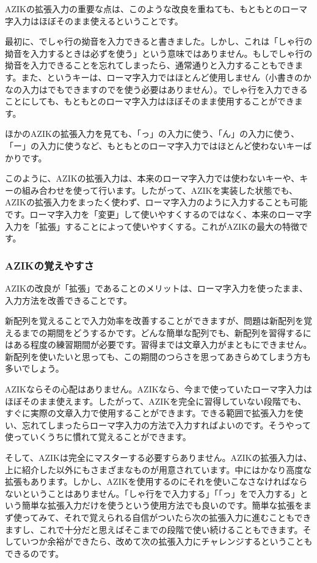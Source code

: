 AZIKの拡張入力の重要な点は、このような改良を重ねても、もともとのローマ字入力はほぼそのまま使えるということです。

最初に、でしゃ行の拗音を入力できると書きました。しかし、これは「しゃ行の拗音を入力するときは必ずを使う」という意味ではありません。もしでしゃ行の拗音を入力できることを忘れてしまったら、通常通りと入力することもできます。また、というキーは、ローマ字入力ではほとんど使用しません（小書きのかなの入力はでもできますのでを使う必要はありません）。でしゃ行を入力できることにしても、もともとのローマ字入力はほぼそのまま使用することができます。

ほかのAZIKの拡張入力を見ても、「っ」の入力に使う\key{;}、「ん」の入力に使う、「ー」の入力に使う\key{:}など、もともとのローマ字入力ではほとんど使わないキーばかりです。

このように、AZIKの拡張入力は、本来のローマ字入力では使わないキーや、キーの組み合わせを使って行います。したがって、AZIKを実装した状態でも、AZIKの拡張入力をまったく使わず、ローマ字入力のように入力することも可能です。ローマ字入力を「変更」して使いやすくするのではなく、本来のローマ字入力を「拡張」することによって使いやすくする。これがAZIKの最大の特徴です。

\subsubsection*{AZIKの覚えやすさ}

AZIKの改良が「拡張」であることのメリットは、ローマ字入力を使ったまま、入力方法を改善できることです。

新配列を覚えることで入力効率を改善することができますが、問題は新配列を覚えるまでの期間をどうするかです。どんな簡単な配列でも、新配列を習得するにはある程度の練習期間が必要です。習得までは文章入力がまともにできません。新配列を使いたいと思っても、この期間のつらさを思ってあきらめてしまう方も多いでしょう。

AZIKならその心配はありません。AZIKなら、今まで使っていたローマ字入力はほぼそのまま使えます。したがって、AZIKを完全に習得していない段階でも、すぐに実際の文章入力で使用することができます。できる範囲で拡張入力を使い、忘れてしまったらローマ字入力の方法で入力すればよいのです。そうやって使っていくうちに慣れて覚えることができます。

そして、AZIKは完全にマスターする必要すらありません。AZIKの拡張入力は、上に紹介した以外にもさまざまなものが用意されています。中にはかなり高度な拡張もあります。しかし、AZIKを使用するのにそれを使いこなさなければならないということはありません。「しゃ行をで入力する」「「っ」を\key{;}で入力する」という簡単な拡張入力だけを使うという使用方法でも良いのです。簡単な拡張をまず使ってみて、それで覚えられる自信がついたら次の拡張入力に進むこともできますし、これで十分だと思えばそこまでの段階で使い続けることもできます。そしていつか余裕ができたら、改めて次の拡張入力にチャレンジするということもできるのです。


